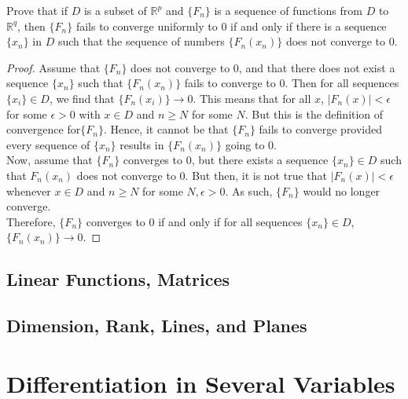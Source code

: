 \documentclass[12pt]{book}
\newcommand{\R}{\mathbb{R}}
\newenvironment{exercise}[2][Exercise]{\begin{trivlist}
\item[\hskip \labelsep {\bfseries #1}\hskip \labelsep {\bfseries #2.}]}{\end{trivlist}}
\begin{document}
\begin{exercise}{8.3.12}
Prove that if $D$ is a subset of $\R^p$ and $\{ F_n\}$ is a sequence of functions from $D$ to $\R^q$, then $\{F_n\}$ fails to converge uniformly to 0 if and only if there is a sequence $\{x_n\}$ in $D$ such that the sequence of numbers $\{ F_n (x_n) \}$ does not converge to 0. 

\begin{proof}
    Assume that $\{F_n\}$ does not converge to 0, and that there does not exist a sequence $\{x_n\}$ such that $\{F_n(x_n)\}$ fails to converge to 0. Then for all sequences $\{x_i\} \in D$, we find that $\{F_n ( x_i)\} \to 0$. This means that for all $x$, $\left| F_n (x) \right| < \epsilon$ for some $\epsilon >0$  with $x \in D$ and $n \geq N$ for some $N$. But this is the definition of convergence for$\{F_n\}$. Hence, it cannot be that $\{F_n\}$ fails to converge provided every sequence of $\{x_n\}$ results in $\{F_n (x_n)\}$ going to 0. \\

    Now, assume that $\{F_n\}$ converges to 0, but there exists a sequence $\{x_n\} \in D$ such that $F_n(x_n)$ does not converge to 0. But then, it is not true that $|F_n(x)|< \epsilon$ whenever $x \in D$ and $n \geq N$ for some $N, \epsilon>0$. As such, $\{F_n\}$ would no longer converge. \\

    Therefore, $\{F_n\}$ converges to 0 if and only if for all sequences $\{x_n\} \in D$, $\{ F_n(x_n)\} \to 0$.
\end{proof}
\end{exercise}





\section{Linear Functions, Matrices}


\section{Dimension, Rank, Lines, and Planes}



\chapter{Differentiation in Several Variables}
\end{document}
